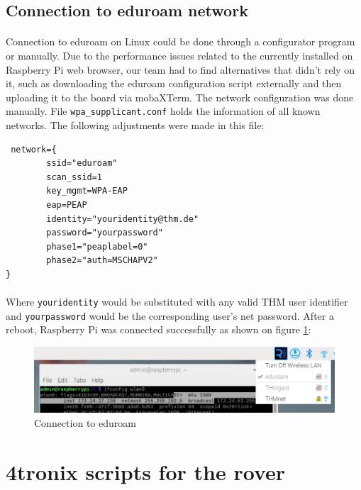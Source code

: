 \subsection{Connection to eduroam network}
\paragraph{} Connection to eduroam on Linux could be done through a configurator program or manually. Due to the performance issues related to the currently installed on Raspberry Pi web browser, our team had to find alternatives that didn’t rely on it, such as downloading the eduroam configuration script externally and then uploading it to the board via mobaXTerm. The network configuration was done manually. File \lstinline|wpa_supplicant.conf| holds the information of all known networks. The following adjustments were made in this file: 

\begin{lstlisting}
 network={
        ssid="eduroam"
        scan_ssid=1
        key_mgmt=WPA-EAP
        eap=PEAP
        identity="youridentity@thm.de"
        password="yourpassword"
        phase1="peaplabel=0"
        phase2="auth=MSCHAPV2"
}
\end{lstlisting}

\paragraph{}Where \lstinline|youridentity| would be substituted with any valid THM user identifier and \lstinline|yourpassword| would be the corresponding user’s net password.
After a reboot, Raspberry Pi was connected successfully as shown on figure \ref{fig:edu_connect}:
\begin{figure}[h]
     \vspace{0.4cm}
     \centering
     \includegraphics[width=0.9\linewidth]{Hauptkapitel/Pictures/edu_connect.png}
     \caption{Connection to eduroam}
     \label{fig:edu_connect}
 \end{figure}

\section{4tronix scripts for the rover}
